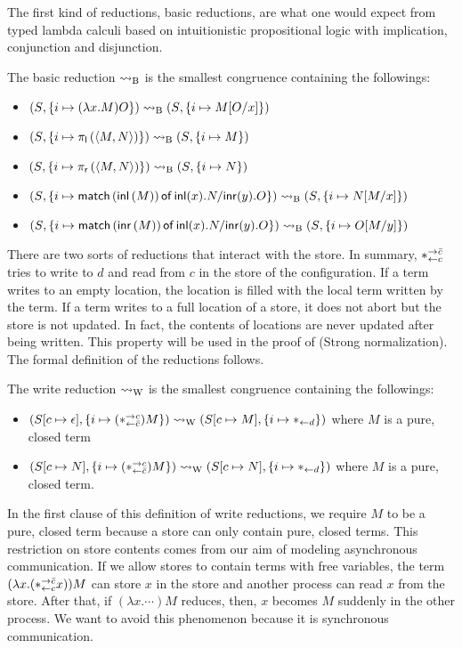 The first kind of reductions, basic reductions, are what one would
expect from typed lambda calculi based on intuitionistic propositional
logic with implication, conjunction and disjunction.
\begin{definition}
 The basic reduction $\rightsquigarrow_{\mathrm B}$ is the smallest congruence containing
 the followings:
 \begin{itemize}
  \item  $({S}{},{\{i\mapsto {(\lambda x.M)O}\}})\rightsquigarrow_{\mathrm B}
	 ({S}{},{\{i\mapsto {M[O/x]}\}})$
  \item $({S}{},{\{i\mapsto {\pi_{\mathsf l}\left({\langle{M,N}\rangle}\right)}\}}) \rightsquigarrow_{\mathrm B}
	 ({S}{},{           \{i\mapsto {M}\}   })$
  \item $({S}{},{\{i\mapsto {\pi_{\mathsf r}\left({\langle{M,N}\rangle}\right)}\}}) \rightsquigarrow_{\mathrm B}
	 ({S}{},{             \{i\mapsto {N}\} })$
  \item $({S}{},{\{i\mapsto {\mathsf{match}\,{(\mathsf{inl}\left({M}\right))}\,\mathsf{of}\, \mathsf{inl}({x}). {N}/ \mathsf{inr}({y}). {O}}\}}) \rightsquigarrow_{\mathrm B}
	 ({S}{},{              \{i\mapsto {N[M/x]}\}})$
  \item $({S}{},{\{i\mapsto {\mathsf{match}\,{(\mathsf{inr}\left({M}\right))}\,\mathsf{of}\, \mathsf{inl}({x}). {N}/ \mathsf{inr}({y}). {O}}\}}) \rightsquigarrow_{\mathrm B}
	 ({S}{},{                  \{i\mapsto {O[M/y]}\}})$
 \end{itemize}
\end{definition}

There are two sorts of reductions that interact with the store.
In summary, $\ast^{\rightarrow {\bar{c}}}_{\leftarrow{c}}$ tries to write to $d$ and read from
$c$ in the store of the configuration.
If a term writes to an empty location, the location is filled with the
local term written by the term.
 If a term writes to a full location of
a store, it does not abort but the store is not updated.  In fact, the
contents of locations are never updated after being written.
This property will be used in the proof of  (Strong normalization).
The formal definition of the reductions follows.
\begin{definition}
 The write reduction $\rightsquigarrow_{\mathrm W}$ is the smallest congruence
 containing the followings:
 \begin{itemize}
  \item $({S}{[c\mapsto \epsilon]},{\{i\mapsto {(\ast^{\rightarrow {c}}_{\leftarrow{\bar{c}}})M}\}}) \rightsquigarrow_{\mathrm W}
	({S}{[c\mapsto M]},{\{i\mapsto {\ast_{\leftarrow{d}}}\}})
	$ where $M$ is a pure, closed term
  \item $({S}{[c\mapsto N]},{\{i\mapsto {(\ast^{\rightarrow {c}}_{\leftarrow{\bar{c}}}) M}\}}) \rightsquigarrow_{\mathrm W}
	({S}{[c\mapsto	N]},{\{i\mapsto {\ast_{\leftarrow{d}}}\}})$ where $M$ is a pure,
	closed term.
 \end{itemize}
\end{definition}
In the first clause of this definition of write reductions, we require
$M$ to be a pure, closed
term because a store can only contain pure, closed terms.
This restriction on store contents comes from our aim of modeling
asynchronous communication.
If we allow stores to contain terms with free variables,
the term $(\lambda x. (\ast^{\rightarrow {\bar{c}}}_{\leftarrow{c}} x)) M$ can store $x$ in the store and
another process can read $x$ from the store.
After that, if $(\lambda x.\cdots)M$ reduces,
then, $x$ becomes $M$ suddenly in the other process.
We want to avoid this phenomenon because it is synchronous communication.


